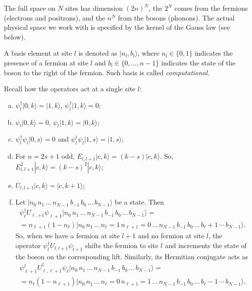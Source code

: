 	The full space on $N$ sites has dimension $(2n)^{N}$, the $2^N$ comes from the fermions (electrons and positrons), 
	and the $n^N$ from the bosons (phonons). The actual physical space we work with is specified by the kernel of the Gauss law (see below).
	
	A basis element at site $l$ is denoted as $|n_l, b_l\rangle$, where $n_l \in \{0,1\}$ indicates the presence of a fermion at site $l$ and $b_l \in \{0,\ldots,n-1\}$ indicates the state of the boson to the right of the fermion. Such basis is called \emph{computational}.
	
	Recall how the operators act at a single site $l$:
	\begin{enumerate}[(a)]
	\item $\psi^\dagger_l |0,k\rangle = |1,k\rangle$, $\psi^\dagger_l |1,k\rangle = 0$;
	\item $\psi_l|0,k\rangle = 0$, $\psi_l|1,k\rangle = |0,k\rangle$;
	\item $\psi^\dagger_l \psi_l |0, s\rangle = 0$ and $\psi^\dagger_l \psi_l |1,s\rangle = |1,s\rangle$;
	\item For $n = 2s+1$ odd, $E_{l,l+1}|c,k\rangle = (k-s)|c,k\rangle$. So, $E_{l,l+1}^2|c,k\rangle = (k-s)^2 |c,k\rangle$;
	\item $U_{l,l+1} |c,k\rangle = |c,k+1\rangle$;
	\item Let $|n_0\, n_1\, \ldots \, n_{N-1} \, b_{-1}\, b_0\, \ldots\, b_{N-1}\rangle$ be a state. Then
	\[\begin{split}
	\psi_\ell^\dagger U_{\ell,+1} \psi_{\ell+1} |n_0\, n_1\, \ldots \, n_{N-1} \, b_{-1}\, b_0\, \ldots\, b_{N-1}\rangle=\\ = n_{\ell+1} (1-n_\ell) |n_0\, n_1\, \ldots \, n_{\ell}=1 \, n_{\ell+1} = 0\,\ldots \, n_{N-1} \, b_{-1}\, b_0\, \ldots\,b_\ell + 1\,\cdots \, b_{N-1}\rangle.
	\end{split}
	\]
	So, when we have a fermion at site $l+1$ and no fermion at site $l$, the operator $\psi_l^\dagger U_{l,l+1} \psi_{l+1}$ shifts the fermion to site $l$ and increments the state of the boson on the corresponding lift. Similarly, its Hermitian conjugate acts as
		\[\begin{split}
	\psi_{\ell+1}^\dagger U_{\ell,\ell+1}^\dagger \psi_{\ell} |n_0\, n_1\, \ldots \, n_{N-1} \, b_{-1}\, b_0\, \ldots\, b_{N-1}\rangle=\\ = n_{\ell} (1-n_{\ell+1}) |n_0\, n_1\, \ldots \, n_{\ell} = 0\, n_{\ell+1} = 1\, \ldots\, n_{N-1} \, b_{-1}\, b_0\, \ldots\,b_\ell -1 \,\cdots \, b_{N-1}\rangle.
	\end{split}
\]
\end{enumerate}
